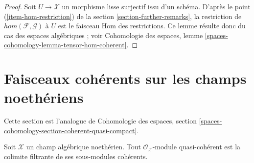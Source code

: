 \begin{proof}
Soit $U \to \mathcal{X}$ un morphisme lisse surjectif issu d'un schéma.
D'après le point (\ref{item-hom-restriction}) de la section \ref{section-further-remarks},
la restriction de
$hom(\mathcal{F}, \mathcal{G})$ à $U$ est le faisceau Hom des restrictions.
Ce lemme résulte donc du cas des espaces algébriques ; voir
Cohomologie des espaces, lemme \ref{spaces-cohomology-lemma-tensor-hom-coherent}.
\end{proof}






\section{Faisceaux cohérents sur les champs noethériens}
\label{section-coherent-on-noetherian}

\noindent
Cette section est l'analogue de
Cohomologie des espaces, section
\ref{spaces-cohomology-section-coherent-quasi-compact}.

\begin{lemma}
\label{lemma-directed-colimit-coherent}
Soit $\mathcal{X}$ un champ algébrique noethérien. Tout
$\mathcal{O}_\mathcal{X}$-module quasi-cohérent est la colimite filtrante
de ses sous-modules cohérents.
\end{lemma}

